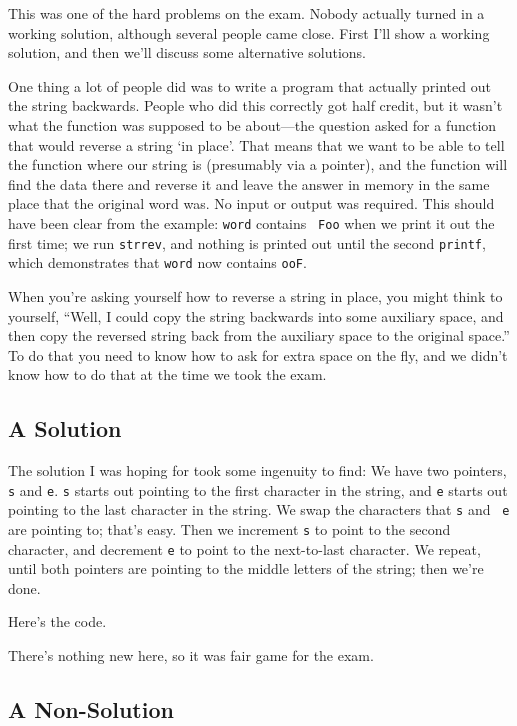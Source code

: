 This was one of the hard problems on the exam.  Nobody actually turned
in a working solution, although several people came close.  First I'll
show a working solution, and then we'll discuss some alternative
solutions.

One thing a lot of people did was to write a program that actually
printed out the string backwards.  People who did this correctly got
half credit, but it wasn't what the function was supposed to be
about---the question asked for a function that would reverse a string
`in place'.  That means that we want to be able to tell the function
where our string is (presumably via a pointer), and the function will
find the data there and reverse it and leave the answer in memory in the
same place that the original word was.  No input or output was required.
This should have been clear from the example:  {\tt word} contains {\tt
Foo} when we print it out the first time; we run {\tt strrev}, and
nothing is printed out until the second {\tt printf}, which demonstrates
that {\tt word} now contains {\tt ooF}. 

When you're asking yourself how to reverse a string in place, you might
think to yourself, ``Well, I could copy the string backwards into some
auxiliary space, and then copy the reversed string back from the
auxiliary space to the original space.''  To do that you need to know
how to ask for extra space on the fly, and we didn't know how to do that
at the time we took the exam.

\subsection{A Solution}

The solution I was hoping for took some ingenuity to find: We have two
pointers, {\tt s} and {\tt e}. {\tt s} starts out pointing to the first
character in the string, and {\tt e} starts out pointing to the last
character in the string.  We swap the characters that {\tt s} and {\tt
e} are pointing to; that's easy.  Then we increment {\tt s} to point to
the second character, and decrement {\tt e} to point to the next-to-last
character.  We repeat, until both pointers are pointing to the middle
letters of the string; then we're done.

Here's the code.



There's nothing new here, so it was fair game for the exam.

\subsection{A Non-Solution}

